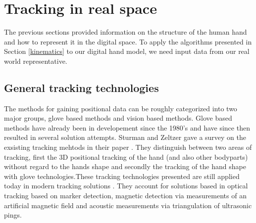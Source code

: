 \chapter{Tracking in real space}
The previous sections provided information on the structure of the human hand and how to represent it in the digital space. To apply the algorithms presented in Section \ref{kinematics} to our digital hand model, we need input data from our real world representative.
\section{General tracking technologies}
\label{General tracking technologies}
The methods for gaining positional data can be roughly categorized into two major groups, glove based methods and vision based methods. Glove based methods have already been in developement since the 1980's \cite{Bolt.1980} and have since then resulted in several solution attempts. Sturman and Zeltzer gave a survey on the exsisting tracking mehtods in their paper \cite{Sturman.1994}. They distinguish between two areas of tracking, first the 3D positional tracking of the hand (and also other bodyparts) without regard to the hands shape and secondly the tracking of the hand shape with glove technologies.These tracking technologies presented are still applied today in modern tracking solutions \cite{Welch.2002,Rolland.2001}. They account for solutions based in optical tracking based on marker detection, magnetic detection via measurements of an artificial magnetic field\cite{Raab.1979} and acoustic measurements via triangulation of ultrasonic pings.

